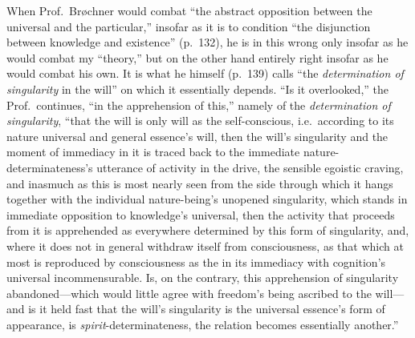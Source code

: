 \documentclass[12pt]{book}
\newcommand{\opage}[1]{\marginnote{\footnotesize\textit{[#1]}}}
\begin{document}
When Prof.~Brøchner would combat ``the abstract opposition between the
universal and the particular,'' insofar as it is to condition ``the
disjunction between knowledge and existence'' (p.\ 132), he is in this
wrong only insofar as he would combat my ``theory,'' but on the other hand
entirely right insofar as he would combat his own. It is what he himself
(p.\ 139) calls ``the \emph{determination of singularity} in the will'' on
which it essentially depends. ``Is it overlooked,'' the Prof.\ continues,
``in the apprehension of this,'' namely of the \emph{determination of
singularity}, ``that the will is only will as the self-conscious, i.e.\
according to its nature universal and general essence's will, then the
will's singularity and the moment of immediacy in it is traced back to
the immediate nature-determinateness's utterance of activity in the drive,
the sensible egoistic craving, and inasmuch as this is most nearly seen
from the side through which it hangs together with the individual
nature-being's unopened singularity, which stands in immediate opposition
to knowledge's universal, then the activity that proceeds from it is
apprehended as everywhere determined by this form of singularity, and,
where it does not in general withdraw itself from consciousness, as that
which at most is reproduced by consciousness as the in its immediacy with
cognition's universal incommensurable. Is, on the contrary, this
apprehension of singularity abandoned---which would little
\opage{32}\setcounter{footnote}{0}%
agree with freedom's being ascribed to the will---and is it held fast
that the will's singularity is the universal essence's form of
appearance, is \emph{spirit}-determinateness, the relation becomes
essentially another.''
\end{document}
